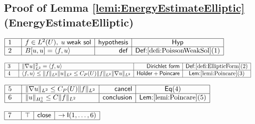 \documentclass[11pt,reqno]{amsart}
\begin{document}
	\subsection*{Proof of Lemma \protect\ref{lemi:EnergyEstimateElliptic} (\textsf{EnergyEstimateElliptic})}
	\noindent$\begin{array}{|m{0.5cm}|l|r|c|}
	\hline
	1 & f\in L^{2}(U),\;u\;\mathsf{weak\ sol} & \mathsf{hypothesis} & \mathsf{Hyp} \\ \hline
	2 & B[u,u]=\langle f,u\rangle & \mathsf{def} & \textsf{Def:}\ref{defi:PoissonWeakSol}(1) \\ \hline
	\end{array}$
	\par\nointerlineskip\noindent$\begin{array}{|m{0.5cm}|l|r|c|}
	\hline
	3 & \|\nabla u\|_{L^{2}}^{2}=\langle f,u\rangle & \mathsf{Dirichlet\ form} & \textsf{Def:}\ref{defi:EllipticForm}(2) \\ \hline
	4 & \langle f,u\rangle\le\|f\|_{L^{2}}\|u\|_{L^{2}}\le C_{P}(U)\|f\|_{L^{2}}\|\nabla u\|_{L^{2}} & \mathsf{Holder+Poincare} & \textsf{Lem:}\ref{lemi:Poincare}(3) \\ \hline
	\end{array}$
	\par\nointerlineskip\noindent$\begin{array}{|m{0.5cm}|l|r|c|}
	\hline
	5 & \|\nabla u\|_{L^{2}}\le C_{P}(U)\|f\|_{L^{2}} & \mathsf{cancel} & \mathsf{Eq}(4) \\ \hline
	6 & \|u\|_{H_{0}^{1}}\le C\|f\|_{L^{2}} & \mathsf{conclusion} & \textsf{Lem:}\ref{lemi:Poincare}(5) \\ \hline
	\end{array}$
	\par\nointerlineskip\noindent$\begin{array}{|m{0.5cm}|l|r|c|}
	\hline
	7 & \top & \mathsf{close} & \to\mathsf{I}(1,\dots,6) \\ \hline
	\end{array}$
	\medskip
	
\end{document}
